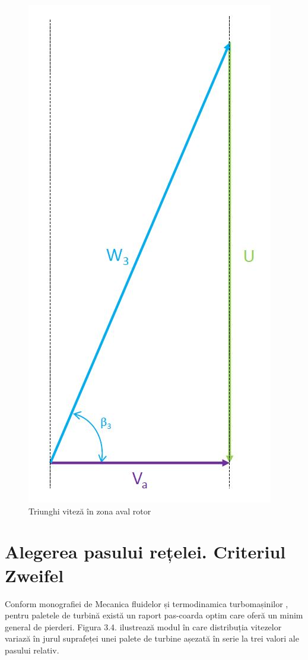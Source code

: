 \begin{figure}[h]
	\centering
	\includegraphics[scale=0.6]{figures/triunghi_viteza_ZAR.jpg}
	\caption{Triunghi viteză în zona aval rotor}
	\label{Triunghi viteză în zona aval rotor}
\end{figure}

\clearpage

\section{Alegerea pasului rețelei. Criteriul Zweifel}

Conform monografiei de Mecanica fluidelor și termodinamica turbomașinilor \cite{hall2013fluid}, pentru paletele de turbină există un raport pas-coarda optim care oferă un minim general de pierderi. Figura 3.4. ilustrează modul în care distribuția vitezelor variază în jurul suprafeței unei palete de turbine așezată în serie la trei valori ale pasului relativ.

